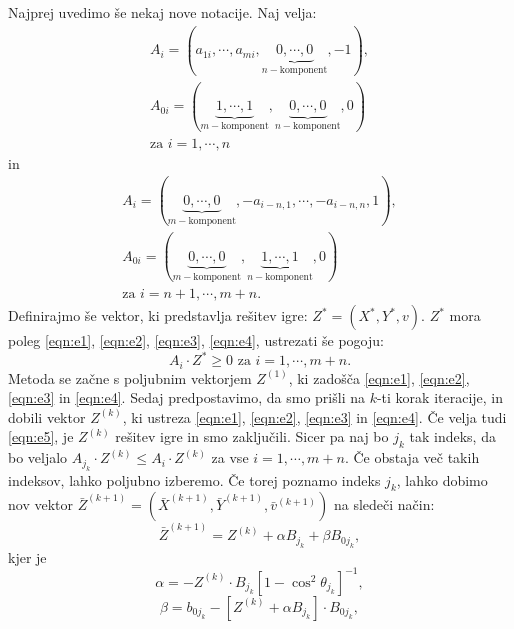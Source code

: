 \documentclass[a4paper,12pt]{article}
\begin{document}
Najprej uvedimo še nekaj nove notacije. Naj velja:
\begin{equation*}
    \begin{split}
    A_i = (a_{1i}, \cdots, a_{mi}, \underbrace{0, \cdots, 0}_{n - \text{komponent}}, -1), \\
    A_{0i} = (\underbrace{1, \cdots, 1}_{m-\text{komponent}}, \underbrace{0, \cdots, 0}_{n-\text{komponent}}, 0) \\
    \text{za} \, \, i = 1, \cdots, n
    \end{split}
\end{equation*} 
in 
\begin{equation*}
    \begin{split}
    A_i = (\underbrace{0, \cdots, 0}_{m - \text{komponent}},-a_{i-n, 1}, \cdots, -a_{i - n, n}, 1), \\
     A_{0i} = (\underbrace{0, \cdots, 0}_{m-\text{komponent}},\underbrace{1, \cdots, 1}_{n-\text{komponent}},  0) \\
    \text{za} \, \, i = n + 1, \cdots, m + n.
    \end{split}
\end{equation*} 
Definirajmo še vektor, ki predstavlja rešitev igre: $Z^* = (X^*, Y^*, v)$. $Z^*$ mora poleg \ref{eqn:e1}, \ref{eqn:e2}, \ref{eqn:e3}, \ref{eqn:e4}, ustrezati še pogoju:
\begin{equation}
\label{eqn:e5}
A_i \cdot Z^* \geq 0 \, \, \text{za} \, \, i = 1, \cdots, m + n.
\end{equation}
Metoda se začne s poljubnim vektorjem $Z^{(1)}$, ki zadošča \ref{eqn:e1}, \ref{eqn:e2}, \ref{eqn:e3} in \ref{eqn:e4}. Sedaj predpostavimo,
 da smo prišli na $k$-ti korak
iteracije, in dobili vektor $Z^{(k)}$,  ki ustreza \ref{eqn:e1}, \ref{eqn:e2}, \ref{eqn:e3} in \ref{eqn:e4}. Če velja tudi
\ref{eqn:e5}, je $Z^{(k)}$ rešitev igre in smo zaključili. Sicer pa naj bo $j_k$ tak indeks, da bo veljalo
$A_{j_k} \cdot Z^{(k)} \leq A_i \cdot Z^{(k)}$ za vse $i = 1, \cdots, m + n$. Če obstaja več takih indeksov, lahko poljubno izberemo.
 Če torej poznamo indeks $j_k$, lahko
dobimo nov vektor $\bar{Z}^{(k+1)} = (\bar{X}^{(k+1)}, \bar{Y}^{(k+1)}, \bar{v}^{(k+1)})$ na sledeči način:
\begin{equation*}
    \bar{Z}^{(k+1)} = Z^{(k)} + \alpha B_{j_k} + \beta B_{0j_k},
\end{equation*}
kjer je
\begin{equation*}
    \alpha = - Z^{(k)} \cdot B_{j_k} [1 - \cos^2{\theta_{j_k}}]^{-1},
\end{equation*}
\begin{equation*}
    \beta = b_{0j_k} - [Z^{(k)} + \alpha B_{j_k}] \cdot B_{0j_k},
\end{equation*}
\end{document}
